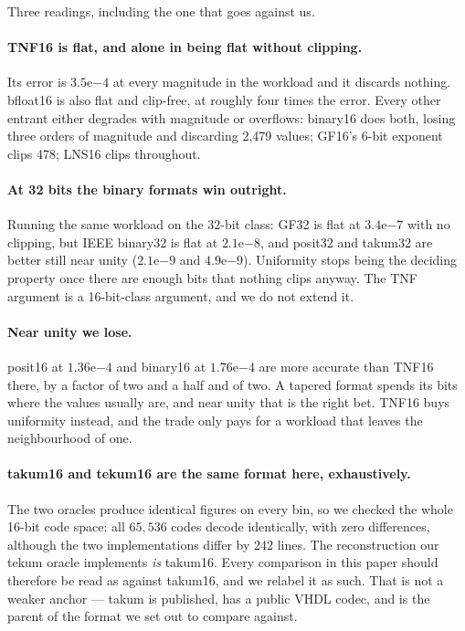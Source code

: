 \documentclass[11pt]{article}
\theoremstyle{definition}
\begin{document}
Three readings, including the one that goes against us.

\paragraph{TNF16 is flat, and alone in being flat without clipping.} Its error
is $3.5\mathrm{e}{-4}$ at every magnitude in the workload and it discards
nothing. bfloat16 is also flat and clip-free, at roughly four times the error.
Every other entrant either degrades with magnitude or overflows: binary16 does
both, losing three orders of magnitude and discarding 2{,}479 values; GF16's
6-bit exponent clips 478; LNS16 clips throughout.

\paragraph{At 32 bits the binary formats win outright.} Running the same
workload on the 32-bit class: GF32 is flat at $3.4\mathrm{e}{-7}$ with no
clipping, but IEEE binary32 is flat at $2.1\mathrm{e}{-8}$, and posit32 and
takum32 are better still near unity ($2.1\mathrm{e}{-9}$ and
$4.9\mathrm{e}{-9}$). Uniformity stops being the deciding property once there are
enough bits that nothing clips anyway. The TNF argument is a 16-bit-class
argument, and we do not extend it.

\paragraph{Near unity we lose.} posit16 at $1.36\mathrm{e}{-4}$ and binary16 at
$1.76\mathrm{e}{-4}$ are more accurate than TNF16 there, by a factor of two and
a half and of two. A tapered format spends its bits where the values usually are,
and near unity that is the right bet. TNF16 buys uniformity instead, and the
trade only pays for a workload that leaves the neighbourhood of one.

\paragraph{takum16 and tekum16 are the same format here, exhaustively.} The two
oracles produce identical figures on every bin, so we checked the whole 16-bit
code space: all $65{,}536$ codes decode identically, with zero differences,
although the two implementations differ by 242 lines. The reconstruction our
tekum oracle implements \emph{is} takum16. Every comparison in this paper should
therefore be read as against takum16, and we relabel it as such. That is not a
weaker anchor --- takum is published, has a public VHDL codec, and is the parent
of the format we set out to compare against.
\end{document}
